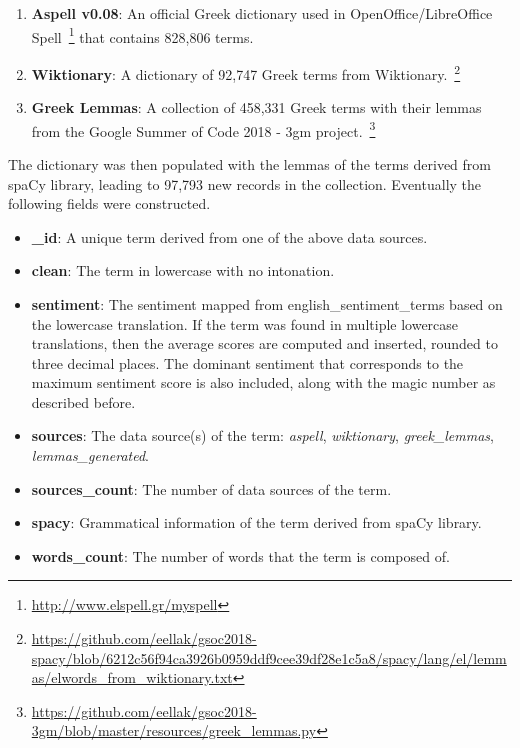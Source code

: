 \begin{enumerate}
 \item \textbf{Aspell v0.08}: An official Greek dictionary used in OpenOffice/LibreOffice Spell~\footnote{\url{http://www.elspell.gr/myspell}}
 that contains 828,806 terms.
    
 \item \textbf{Wiktionary}: A dictionary of 92,747 Greek terms from Wiktionary.~\footnote{\url{https://github.com/eellak/gsoc2018-spacy/blob/6212c56f94ca3926b0959ddf9cee39df28e1c5a8/spacy/lang/el/lemmas/elwords_from_wiktionary.txt}}

 \item \textbf{Greek Lemmas}: A collection of 458,331 Greek terms with their lemmas
 from the Google Summer of Code 2018 - 3gm project.~\footnote{\url{https://github.com/eellak/gsoc2018-3gm/blob/master/resources/greek_lemmas.py}}
\end{enumerate}

The dictionary was then populated with the lemmas of the terms
derived from spaCy library, leading to 97,793 new records in the collection.
Eventually the following fields were constructed.

\begin{itemize}
 \item \textbf{\_id}: A unique term derived from one of the above data sources.
 
 \item \textbf{clean}: The term in lowercase with no intonation.
 
 \item \textbf{sentiment}: The sentiment mapped from english\_sentiment\_terms
 based on the lowercase translation.
 If the term was found in multiple lowercase translations,
 then the average scores are computed and inserted,
 rounded to three decimal places.
 The dominant sentiment that corresponds to the maximum sentiment score
 is also included, along with the magic number as described before.
 
 \item \textbf{sources}: The data source(s) of the term:
 \emph{aspell}, \emph{wiktionary}, \emph{greek\_lemmas}, \emph{lemmas\_generated}.
 
 \item \textbf{sources\_count}: The number of data sources of the term.
 
 \item \textbf{spacy}: Grammatical information of the term
 derived from spaCy library.
 
 \item \textbf{words\_count}: The number of words that the term is composed of.
\end{itemize}

